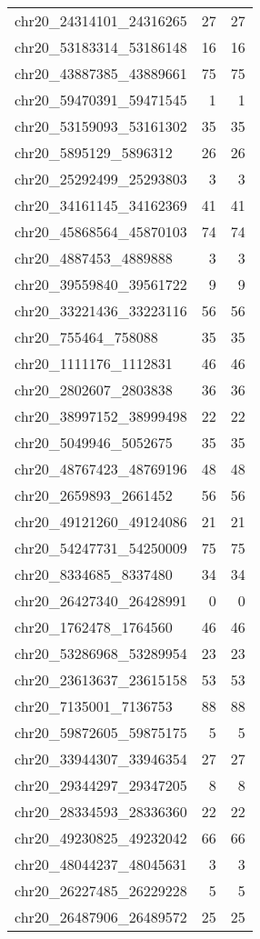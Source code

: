 \begin{longtable}{lrr}
chr20_24314101_24316265 & 27 & 27 \\
chr20_53183314_53186148 & 16 & 16 \\
chr20_43887385_43889661 & 75 & 75 \\
chr20_59470391_59471545 & 1 & 1 \\
chr20_53159093_53161302 & 35 & 35 \\
chr20_5895129_5896312 & 26 & 26 \\
chr20_25292499_25293803 & 3 & 3 \\
chr20_34161145_34162369 & 41 & 41 \\
chr20_45868564_45870103 & 74 & 74 \\
chr20_4887453_4889888 & 3 & 3 \\
chr20_39559840_39561722 & 9 & 9 \\
chr20_33221436_33223116 & 56 & 56 \\
chr20_755464_758088 & 35 & 35 \\
chr20_1111176_1112831 & 46 & 46 \\
chr20_2802607_2803838 & 36 & 36 \\
chr20_38997152_38999498 & 22 & 22 \\
chr20_5049946_5052675 & 35 & 35 \\
chr20_48767423_48769196 & 48 & 48 \\
chr20_2659893_2661452 & 56 & 56 \\
chr20_49121260_49124086 & 21 & 21 \\
chr20_54247731_54250009 & 75 & 75 \\
chr20_8334685_8337480 & 34 & 34 \\
chr20_26427340_26428991 & 0 & 0 \\
chr20_1762478_1764560 & 46 & 46 \\
chr20_53286968_53289954 & 23 & 23 \\
chr20_23613637_23615158 & 53 & 53 \\
chr20_7135001_7136753 & 88 & 88 \\
chr20_59872605_59875175 & 5 & 5 \\
chr20_33944307_33946354 & 27 & 27 \\
chr20_29344297_29347205 & 8 & 8 \\
chr20_28334593_28336360 & 22 & 22 \\
chr20_49230825_49232042 & 66 & 66 \\
chr20_48044237_48045631 & 3 & 3 \\
chr20_26227485_26229228 & 5 & 5 \\
chr20_26487906_26489572 & 25 & 25 \\

\end{longtable}
